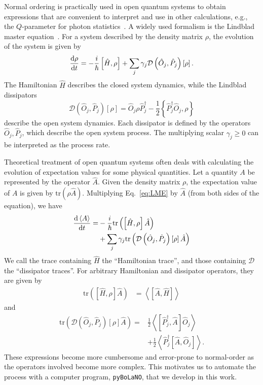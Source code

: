 \documentclass[5p, twocolumn, 10pt, sort&compress]{elsarticle}
\newcounter{bla}
\newcommand{\trace}[1]{\mathrm{tr}\left({#1}\right)}
\newcommand{\expval}[1]{\left\langle{#1}\right\rangle}
\newcommand{\comm}[2]{\left[{#1},{#2}\right]}
\newcommand{\acomm}[2]{\left\{{#1},{#2}\right\}}
\newcommand{\dissip}[1]{\mathcal{D}\left({#1}\right)\left[\rho\right]}
\begin{document}
Normal ordering is practically used in open quantum systems to obtain expressions that are convenient to interpret and use in other calculations, e.g., the $Q$-parameter for photon statistics~\cite{gerry_introductory_2005}. A widely used formalism is the Lindblad master equation~\cite{schlosshauer_decoherence_2007, breuer_theory_2002}.  For a system described by the density matrix $\rho$, the evolution of the system is given by
\begin{equation}\label{eq:LME}
    \odv{\rho}{t} = -\frac{i}{\hbar}\comm{\hat{H}}{\rho} + \sum_j \gamma_j\dissip{\hat{O}_j, \hat{P}_j}.
\end{equation}
The Hamiltonian $\hat{H}$ describes the closed system dynamics, while the Lindblad dissipators 
\begin{equation}
    \dissip{\hat{O}_j, \hat{P}_j} = \hat{O}_j\rho\hat{P}_j^\dagger - \frac{1}{2}\acomm{\hat{P}_j^\dagger\hat{O}_j}{\rho}
\end{equation}
describe the open system dynamics. Each dissipator is defined by the operators $\hat{O}_j, \hat{P}_j$, which describe the open system process.  The multiplying scalar $\gamma_j\geq 0$ can be interpreted as the process rate. 

Theoretical treatment of open quantum systems often deals with calculating the evolution of expectation values for some physical quantities.  Let a quantity $A$ be represented by the operator $\hat{A}$.  Given the density matrix $\rho$, the expectation value of $A$ is given by $\trace{\rho \hat{A}}$.  Multiplying Eq.~\eqref{eq:LME} by $\hat{A}$ (from both sides of the equation), we have
\begin{equation}\begin{split}
    \odv{\expval{A}}{t} =& -\frac{i}{\hbar}\trace{\comm{\hat{H}}{\rho}\hat{A}} 
    \\
    &+ \sum_j \gamma_j \trace{\dissip{\hat{O}_j,\hat{P}_j}\hat{A}}
    \label{eq:LME_expval_evo}
\end{split}\end{equation}
We call the trace containing $\hat{H}$ the ``Hamiltonian trace'', and those containing $\mathcal{D}$ the ``dissipator traces''. For arbitrary Hamiltonian and dissipator operators, they are given by
\begin{align}
    \trace{\comm{\hat{H}}{\rho}\hat{A}} &= \expval{\comm{\hat{A}}{\hat{H}}}
    \label{eq:Ham_trace}
\end{align}
and
\begin{equation}\begin{split}\label{eq:dissip_trace}
    \trace{\dissip{\hat{O}_j,\hat{P}_j}\hat{A}} =& 
    \frac{1}{2}\expval{\comm{\hat{P}_j^\dagger}{\hat{A}}\hat{O}_j}
    \\
    &+\frac{1}{2}\expval{\hat{P}_j^\dagger\comm{\hat{A}}{\hat{O}_j}} .
\end{split}\end{equation}
These expressions become more cumbersome and error-prone to normal-order as the operators involved become more complex. This motivates us to automate the process with a computer program, \texttt{pyBoLaNO}, that we develop in this work.
\end{document}

